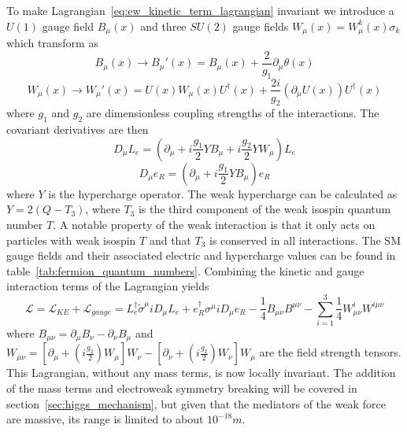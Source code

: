 To make Lagrangian~\ref{eq:ew_kinetic_term_lagrangian} invariant we introduce a $U\left(1\right)$ gauge field $B_{\mu}\left(x\right)$ and three $SU\left(2\right)$ gauge fields $W_{\mu}\left(x\right)=W_{\mu}^{k}\left(x\right)\sigma_{k}$ which transform as
\begin{equation}
	B_{\mu}\left(x\right){\rightarrow}B_{\mu}'\left(x\right)=B_{\mu}\left(x\right)+\frac{2}{g_{1}}\partial_{\mu}\theta\left(x\right)
\end{equation}
\begin{equation}
	W_{\mu}\left(x\right){\rightarrow}W_{\mu}'\left(x\right)=U\left(x\right)W_{\mu}\left(x\right)U^{\dagger}\left(x\right)+\frac{2i}{g_{2}}\left(\partial_{\mu}U\left(x\right)\right)U^{\dagger}\left(x\right)
\end{equation}
where $g_{1}$ and $g_{2}$ are dimensionless coupling strengths of the interactions.
The covariant derivatives are then
\begin{equation}
	D_{\mu}L_{e}=\left(\partial_{\mu}+i\frac{g_{1}}{2}YB_{\mu}+i\frac{g_{2}}{2}YW_{\mu}\right)L_{e}
\end{equation}
\begin{equation}
	D_{\mu}e_{R}=\left(\partial_{\mu}+i\frac{g_{1}}{2}YB_{\mu}\right)e_{R}
\end{equation}
where $Y$ is the hypercharge operator.
The weak hypercharge can be calculated as $Y=2\left(Q-T_{3}\right)$, where $T_{3}$ is the third component of the weak isospin quantum number $T$.
A notable property of the weak interaction is that it only acts on particles with weak isospin $T$ and that $T_{3}$ is conserved in all interactions.
The SM gauge fields and their associated electric and hypercharge values can be found in table~\ref{tab:fermion_quantum_numbers}.
Combining the kinetic and gauge interaction terms of the Lagrangian yields
\begin{equation}\label{eq:electron_electroweak_lagrangian}
	\mathcal{L}=\mathcal{L}_{KE}+\mathcal{L}_{gauge}=L_{e}^{\dagger}\tilde{\sigma}^{\mu}iD_{\mu}L_{e}+e_{R}^{\dagger}\sigma^{\mu}iD_{\mu}e_{R}-\frac{1}{4}B_{\mu\nu}B^{\mu\nu}-\sum_{i=1}^{3}\frac{1}{4}W_{\mu\nu}^{i}W^{i\mu\nu}
\end{equation}
where $B_{\mu\nu}=\partial_{\mu}B_{\nu}-\partial_{\nu}B_{\mu}$ and $W_{\mu\nu}=\left[\partial_{\mu}+\left(i\frac{g_{2}}{2}\right)W_{\mu}\right]W_{\nu}-\left[\partial_{\nu}+\left(i\frac{g_{2}}{2}\right)W_{\nu}\right]W_{\mu}$ are the field strength tensors.
This Lagrangian, without any mass terms, is now locally invariant.
The addition of the mass terms and electroweak symmetry breaking will be covered in section~\ref{sec:higgs_mechanism}, but given that the mediators of the weak force are massive, its range is limited to about $10^{-18}\unit{m}$.

